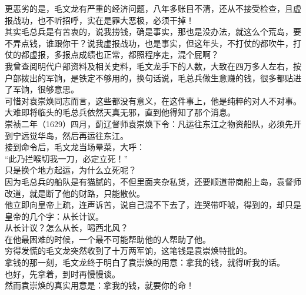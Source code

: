 \begin{multicols}{\theparacolNo}
更恶劣的是，毛文龙有严重的经济问题，八年多账目不清，还从不接受检查，且虚报战功，也不听招呼，实在是罪大恶极，必须干掉！\\

其实毛总兵是有苦衷的，说我捞钱，确是事实，那也是没办法，就这么个荒岛，要不弄点钱，谁跟你干？说我虚报战功，也是事实，但这年头，不打仗的都吹牛，打仗的都虚报，多报点成绩也正常，都照程序走，混个屁啊？\\

我曾查阅明代户部资料及相关史料，毛文龙手下的人数，大致在四万多人左右，按户部拨出的军饷，是铁定不够用的，换句话说，毛总兵做生意赚的钱，很多都贴进了军饷，很够意思。\\

可惜对袁崇焕同志而言，这些都没有意义，在这件事上，他是纯粹的对人不对事。\\

大难即将临头的毛总兵依然天真无邪，直到他得知了那个消息。\\

崇祯二年（1629）四月，蓟辽督师袁崇焕下令：凡运往东江之物资船队，必须先开到宁远觉华岛，然后再运往东江。\\

接到命令后，毛文龙当场晕菜，大呼：\\

“此乃拦喉切我一刀，必定立死！”\\

只是换个地方起运，为什么立死呢？\\

因为毛总兵的船队是有猫腻的，不但里面夹杂私货，还要顺道带商船上岛，袁督师改道，就是断了他的财路，只能散伙。\\

他立即向皇帝上疏，连声诉苦，说自己混不下去了，连哭带吓唬，得到的，却只是皇帝的几个字：从长计议。\\

从长计议？怎么从长，喝西北风？\\

在他最困难的时候，一个最不可能帮助他的人帮助了他。\\

穷得发慌的毛文龙突然收到了十万两军饷，这笔钱是袁崇焕特批的。\\

拿钱的那一刻，毛文龙终于明白了袁崇焕的用意：拿我的钱，就得听我的话。\\

也好，先拿着，到时再慢慢谈。\\

然而袁崇焕的真实用意是：拿我的钱，就要你的命！\\


\end{multicols}
